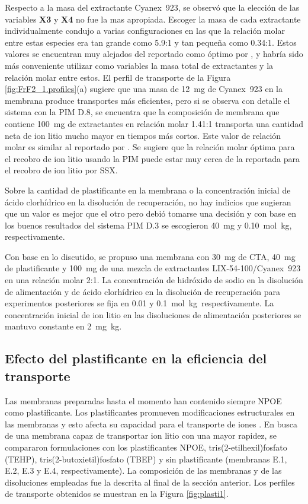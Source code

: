 Respecto a la masa del extractante Cyanex~923, se observó que la elección de las variables \textbf{X3} y \textbf{X4} no fue la mas apropiada. Escoger la masa de cada extractante individualmente condujo a varias configuraciones en las que la relación molar entre estas especies era tan grande como 5.9:1 y tan pequeña como 0.34:1. Estos valores se encuentran muy alejados del reportado como óptimo por \citet{Pranolo2015}, y habría sido más conveniente utilizar como variables la masa total de extractantes y la relación molar entre estos. El perfil de transporte de la Figura \ref{fig:FrF2_1.profiles}(a)  sugiere que una masa de 12~mg de Cyanex~923 en la membrana produce transportes más eficientes, pero si se observa con detalle el sistema con la PIM D.8, se encuentra que la composición de membrana que contiene 100~mg de extractantes en relación molar 1.41:1 transporta una cantidad neta de ion litio mucho mayor en tiempos más cortos. Este valor de relación molar es similar al reportado por \citet{Pranolo2015}. Se sugiere que la relación molar óptima para el recobro de ion litio usando la PIM puede estar muy cerca de la reportada para el recobro de ion litio por \ac{SSX}.

Sobre la cantidad de plastificante en la membrana o la concentración inicial de ácido clorhídrico en la disolución de recuperación, no hay indicios que sugieran que un valor es mejor que el otro pero debió tomarse una decisión y con base en los buenos resultados del sistema PIM D.3 se escogieron 40~mg y 0.10~mol~kg\mnn, respectivamente.

Con base en lo discutido, se propuso una membrana con 30~mg de CTA, 40~mg de plastificante y 100~mg de una mezcla de extractantes LIX-54-100/Cyanex~923 en una relación molar 2:1. La concentración de hidróxido de sodio en la disolución de alimentación y de ácido clorhídrico en la disolución de recuperación para experimentos posteriores se fija en 0.01 y 0.1~mol~kg\mnn\, res\-pec\-tivamente. La concentración inicial de ion litio en las disoluciones de alimentación posteriores se mantuvo constante en 2~mg~kg\mnn.

\subsection{Efecto del plastificante en la eficiencia del transporte}
Las membranas preparadas hasta el momento han contenido siempre \ac{NPOE} como plastificante. Los plastificantes promueven modificaciones estructurales en las membranas y esto afecta su capacidad para el transporte de iones \citep{RodriguezdeSanMiguel2008}. En busca de una membrana capaz de transportar ion litio con una mayor rapidez, se compararon formulaciones con los plastificantes \ac{NPOE}, tris(2-etilhexil)fosfato (TEHP), tris(2-butoxietil)fosfato (TBEP)  y sin plastificante (membranas E.1, E.2, E.3 y E.4, respectivamente). La composición de las membranas y de las disoluciones empleadas fue la descrita al final de la sección anterior. Los perfiles de transporte obtenidos se muestran en la Figura \ref{fig:plasti1}.

